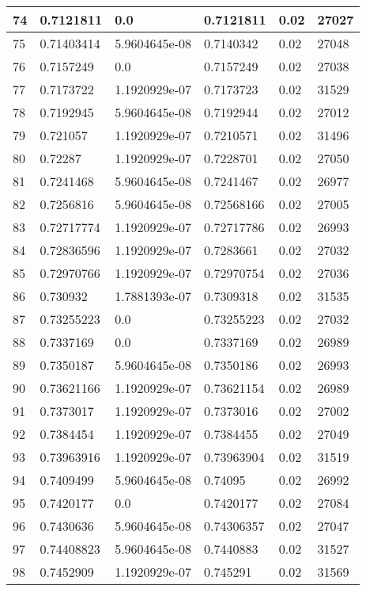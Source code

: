 \begin{longtable}{|l|l|l|l|l|l|}
74 & 0.7121811 & 0.0 & 0.7121811 & 0.02 & 27027 \\ \hline 
75 & 0.71403414 & 5.9604645e-08 & 0.7140342 & 0.02 & 27048 \\ \hline 
76 & 0.7157249 & 0.0 & 0.7157249 & 0.02 & 27038 \\ \hline 
77 & 0.7173722 & 1.1920929e-07 & 0.7173723 & 0.02 & 31529 \\ \hline 
78 & 0.7192945 & 5.9604645e-08 & 0.7192944 & 0.02 & 27012 \\ \hline 
79 & 0.721057 & 1.1920929e-07 & 0.7210571 & 0.02 & 31496 \\ \hline 
80 & 0.72287 & 1.1920929e-07 & 0.7228701 & 0.02 & 27050 \\ \hline 
81 & 0.7241468 & 5.9604645e-08 & 0.7241467 & 0.02 & 26977 \\ \hline 
82 & 0.7256816 & 5.9604645e-08 & 0.72568166 & 0.02 & 27005 \\ \hline 
83 & 0.72717774 & 1.1920929e-07 & 0.72717786 & 0.02 & 26993 \\ \hline 
84 & 0.72836596 & 1.1920929e-07 & 0.7283661 & 0.02 & 27032 \\ \hline 
85 & 0.72970766 & 1.1920929e-07 & 0.72970754 & 0.02 & 27036 \\ \hline 
86 & 0.730932 & 1.7881393e-07 & 0.7309318 & 0.02 & 31535 \\ \hline 
87 & 0.73255223 & 0.0 & 0.73255223 & 0.02 & 27032 \\ \hline 
88 & 0.7337169 & 0.0 & 0.7337169 & 0.02 & 26989 \\ \hline 
89 & 0.7350187 & 5.9604645e-08 & 0.7350186 & 0.02 & 26993 \\ \hline 
90 & 0.73621166 & 1.1920929e-07 & 0.73621154 & 0.02 & 26989 \\ \hline 
91 & 0.7373017 & 1.1920929e-07 & 0.7373016 & 0.02 & 27002 \\ \hline 
92 & 0.7384454 & 1.1920929e-07 & 0.7384455 & 0.02 & 27049 \\ \hline 
93 & 0.73963916 & 1.1920929e-07 & 0.73963904 & 0.02 & 31519 \\ \hline 
94 & 0.7409499 & 5.9604645e-08 & 0.74095 & 0.02 & 26992 \\ \hline 
95 & 0.7420177 & 0.0 & 0.7420177 & 0.02 & 27084 \\ \hline 
96 & 0.7430636 & 5.9604645e-08 & 0.74306357 & 0.02 & 27047 \\ \hline 
97 & 0.74408823 & 5.9604645e-08 & 0.7440883 & 0.02 & 31527 \\ \hline 
98 & 0.7452909 & 1.1920929e-07 & 0.745291 & 0.02 & 31569 \\ \hline 

\end{longtable}
